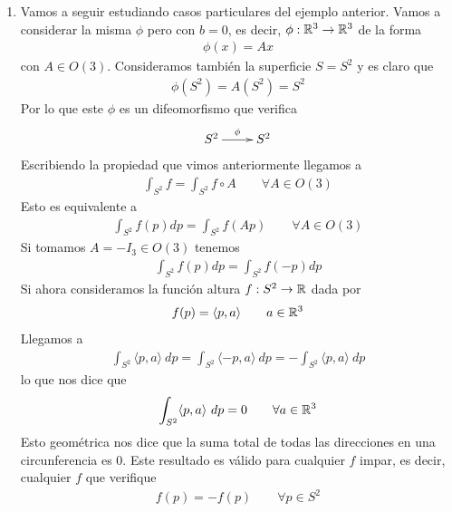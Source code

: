 \begin{ejemplo}
\begin{enumerate}
        \item Vamos a seguir estudiando casos particulares del ejemplo anterior. Vamos a considerar la misma $\phi$ pero con $b=0$, es decir, $\phi: \mathbb{R}^3 \to \mathbb{R}^3$ de la forma 
        \begin{gather*}
            \phi(x) = Ax
        \end{gather*}
        con $A\in O(3)$. Consideramos también la superficie $S=S^2$ y es claro que 
        \begin{gather*}
            \phi(S^2) = A(S^2) = S^2
        \end{gather*}
        Por lo que este $\phi$ es un difeomorfismo que verifica
        \begin{gather*}
            \xymatrix{
                S^2 \ar[r]^{\phi} & S^2
            }
        \end{gather*}
        Escribiendo la propiedad que vimos anteriormente llegamos a
        \begin{gather*}
            \int_{S^2} f = \int_{S^2} f \circ A \qquad \forall A \in O(3)
        \end{gather*}
        Esto es equivalente a 
        \begin{gather*}
            \int_{S^2} f(p) dp = \int_{S^2} f(Ap) \qquad \forall A \in O(3)
        \end{gather*}
        Si tomamos $A = - I_3\in O(3)$ tenemos
        \begin{gather*}
            \int_{S^2} f(p) dp = \int_{S^2} f(-p) dp
        \end{gather*}
        Si ahora consideramos la función altura $f: S^2 \to \mathbb{R}$ dada por 
        \begin{gather*}
            f(p) = \langle p,a \rangle  \qquad a\in \mathbb{R}^3
        \end{gather*}
        Llegamos a 
        \begin{gather*}
            \int_{S^2} \langle p,a \rangle\ dp = \int_{S^2} \langle -p, a \rangle\ dp = - \int_{S^2} \langle p,a \rangle\ dp
        \end{gather*}
        lo que nos dice que 
        \begin{gather*}
            \int_{S^2} \langle p,a \rangle\ dp = 0\qquad \forall a \in \mathbb{R}^3
        \end{gather*}
        Esto geométrica nos dice que la suma total de todas las direcciones en una circunferencia es 0. Este resultado es válido para cualquier $f$ impar, es decir, cualquier $f$ que verifique
        \begin{gather*}
            f(p) = -f(p) \qquad \forall p \in S^2
        \end{gather*}


\end{enumerate}
\end{ejemplo}
